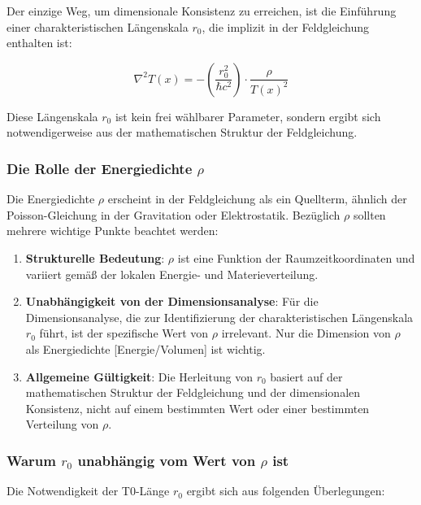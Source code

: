 \documentclass[12pt,a4paper]{article}
\newcommand{\Tfield}{T(x)}
\begin{document}
	Der einzige Weg, um dimensionale Konsistenz zu erreichen, ist die Einführung einer charakteristischen Längenskala \(r_0\), die implizit in der Feldgleichung enthalten ist:
	
	\begin{equation}
		\nabla^2\Tfield = -\left(\frac{r_0^2}{\hbar c^2}\right) \cdot \frac{\rho}{\Tfield^2}
	\end{equation}
	
	Diese Längenskala \(r_0\) ist kein frei wählbarer Parameter, sondern ergibt sich notwendigerweise aus der mathematischen Struktur der Feldgleichung.
	
	\subsubsection{Die Rolle der Energiedichte \(\rho\)}
	
	Die Energiedichte \(\rho\) erscheint in der Feldgleichung als ein Quellterm, ähnlich der Poisson-Gleichung in der Gravitation oder Elektrostatik. Bezüglich \(\rho\) sollten mehrere wichtige Punkte beachtet werden:
	
	\begin{enumerate}
		\item \textbf{Strukturelle Bedeutung}: \(\rho\) ist eine Funktion der Raumzeitkoordinaten und variiert gemäß der lokalen Energie- und Materieverteilung.
		
		\item \textbf{Unabhängigkeit von der Dimensionsanalyse}: Für die Dimensionsanalyse, die zur Identifizierung der charakteristischen Längenskala \(r_0\) führt, ist der spezifische Wert von \(\rho\) irrelevant. Nur die Dimension von \(\rho\) als Energiedichte [Energie/Volumen] ist wichtig.
		
		\item \textbf{Allgemeine Gültigkeit}: Die Herleitung von \(r_0\) basiert auf der mathematischen Struktur der Feldgleichung und der dimensionalen Konsistenz, nicht auf einem bestimmten Wert oder einer bestimmten Verteilung von \(\rho\).
	\end{enumerate}
	
	\subsubsection{Warum \(r_0\) unabhängig vom Wert von \(\rho\) ist}
	
	Die Notwendigkeit der T0-Länge \(r_0\) ergibt sich aus folgenden Überlegungen:
	
\end{document}

